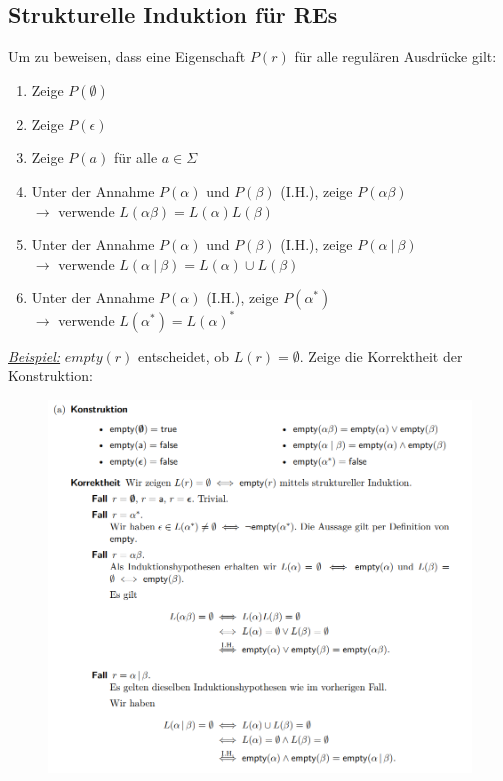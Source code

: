 \documentclass[ieeetran]{article}
\begin{document}
\subsection{Strukturelle Induktion für REs} %
\label{sub:strukturelle_induktion}
Um zu beweisen, dass eine Eigenschaft $P(r)$ für alle regulären Ausdrücke gilt:
\begin{enumerate}
	\item Zeige $P(\emptyset)$
	\item Zeige $P(\epsilon)$
	\item Zeige $P(a)$ für alle $a \in \Sigma$
	\item Unter der Annahme $P(\alpha)$ und $P(\beta)$ (I.H.), zeige $P(\alpha \beta)$ \\$\rightarrow$ verwende $L(\alpha \beta) =L(\alpha)L(\beta)$
	\item Unter der Annahme $P(\alpha)$ und $P(\beta)$ (I.H.), zeige $P(\alpha \ | \ \beta)$ \\$\rightarrow$ verwende $L(\alpha \ | \ \beta) =L(\alpha) \cup L(\beta)$
	\item Unter der Annahme $P(\alpha)$ (I.H.), zeige $P(\alpha^*)$ \\$\rightarrow$ verwende $L(\alpha^*) = L(\alpha)^*$

\end{enumerate}


\hspace{-0.65cm} \textit{\underline{Beispiel:}} $empty(r)$ entscheidet, ob $L(r) = \emptyset$. Zeige die Korrektheit der Konstruktion:

\begin{figure}[h!]
  \centering
  \includegraphics[width=0.65\linewidth]{strukturelleinduktion}
  \label{fig:strukturelleinduktion}
\end{figure}
\end{document}
